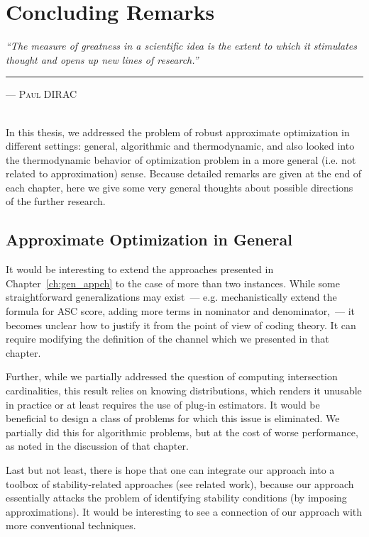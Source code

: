 \chapter{Concluding Remarks}
\label{ch:conclusion}

\hfill
\begin{minipage}[t]{.75\textwidth}
\textit{``The measure of greatness in a scientific idea is the extent to which
it stimulates thought and opens up new lines of research.''} \\
  \hrule
  \vspace{.2cm}
  \hfill
  \textsc{---  Paul DIRAC}
\end{minipage}
\\[.5cm]

In this thesis, we addressed the problem of robust approximate optimization in
different settings: general, algorithmic and thermodynamic, and also looked into
the thermodynamic behavior of optimization problem in a more general (i.e. not
related to approximation) sense. Because detailed remarks are given at the end
of each chapter, here we give some very general thoughts about possible
directions of the further research.

\section{Approximate Optimization in General}

It would be interesting to extend the approaches presented in
Chapter~\ref{ch:gen_appch} to the case of more than two instances.
While some straightforward generalizations may exist~--- e.g. mechanistically
extend the formula for ASC score, adding more terms in nominator and
denominator,~--- it becomes unclear how to justify it from the point of view of
coding theory. It can require modifying the definition of the channel which
we presented in that chapter.

Further, while we partially addressed the question of computing intersection
cardinalities, this result relies on knowing distributions, which renders it
unusable in practice or at least requires the use of plug-in estimators. It
would be beneficial to design a class of problems for which this issue
is eliminated. We partially did this for algorithmic problems, but at the cost
of worse performance, as noted in the discussion of that chapter.

Last but not least, there is hope that one can integrate our approach into a
toolbox of stability-related approaches (see related work), because our approach
essentially attacks the problem of identifying stability conditions (by imposing
approximations). It would be interesting to see a connection of our approach
with more conventional techniques.

